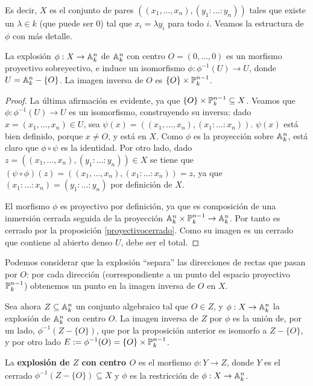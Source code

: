 \documentclass[ACGA.tex]{subfiles}
\begin{document}
Es decir, $X$ es el conjunto de pares $((x_1,\ldots,x_n),(y_1:\ldots:y_n))$ tales que existe un $\lambda\in k$ (que puede ser $0$) tal que $x_i=\lambda y_i$ para todo $i$. Veamos la estructura de $\phi$ con más detalle.

\begin{prop}
 La explosión $\phi:X\to\mathbb{A}^n_k$ de $\mathbb{A}^n_k$ con centro $O=(0,\ldots,0)$ es un morfismo proyectivo sobreyectivo, e induce un isomorfismo $\phi:\phi^{-1}(U)\to U$, donde $U=\mathbb{A}^n_k-\{O\}$. La imagen inversa de $O$ es $\{O\}\times\mathbb{P}^{n-1}_k$.
\end{prop}

\begin{proof}
 La última afirmación es evidente, ya que $\{O\}\times\mathbb{P}^{n-1}_k\subseteq X$. Veamos que $\phi:\phi^{-1}(U)\to U$ es un isomorfismo, construyendo su inversa: dado $x=(x_1,\ldots,x_n)\in U$, sea $\psi(x)=((x_1,\ldots,x_n),(x_1:\ldots:x_n))$. $\psi(x)$ está bien definido, porque $x\neq O$, y está en $X$. 
 Como $\phi$ es la proyección sobre $\mathbb{A}^n_k$, está claro que $\phi\circ\psi$ es la identidad. Por otro lado, dado $z=((x_1,\ldots,x_n),(y_1:\ldots:y_n))\in X$ se tiene que $(\psi\circ\phi)(z)=((x_1,\ldots,x_n),(x_1:\ldots:x_n))=z$, ya que $(x_1:\ldots:x_n)=(y_1:\ldots:y_n)$ por definición de $X$.

El morfismo $\phi$ es proyectivo por definición, ya que es composición de una inmersión cerrada seguida de la proyección $\mathbb{A}^n_k\times\mathbb{P}^{n-1}_k\to\mathbb{A}^n_k$. Por tanto es cerrado por la proposición \ref{proyectivocerrado}. Como su imagen es un cerrado que contiene al abierto denso $U$, debe ser el total. 
\end{proof}

Podemos considerar que la explosión ``separa'' las direcciones de rectas que pasan por $O$: por cada dirección (correspondiente a un punto del espacio proyectivo $\mathbb{P}^{n-1}_k$) obtenemos un punto en la imagen inversa de $O$ en $X$.

Sea ahora $Z\subseteq\mathbb{A}^n_k$ un conjunto algebraico tal que $O\in Z$, y $\phi:X\to\mathbb{A}^n_k$ la explosión de $\mathbb{A}^n_k$ con centro $O$. La imagen inversa de $Z$ por $\phi$ es la unión de, por un lado, $\phi^{-1}(Z-\{O\})$, que por la proposición anterior es isomorfo a $Z-\{O\}$, y por otro lado $E:=\phi^{-1}(O)=\{O\}\times\mathbb{P}^{n-1}_k$. 

\begin{defi}
 La {\bf explosión de $Z$ con centro $O$} es el morfismo $\phi:Y\to Z$, donde $Y$ es el cerrado $\overline{\phi^{-1}(Z-\{O\})}\subseteq X$ y $\phi$ es la restricción de $\phi:X\to\mathbb{A}^n_k$.
\end{defi}
\end{document}
